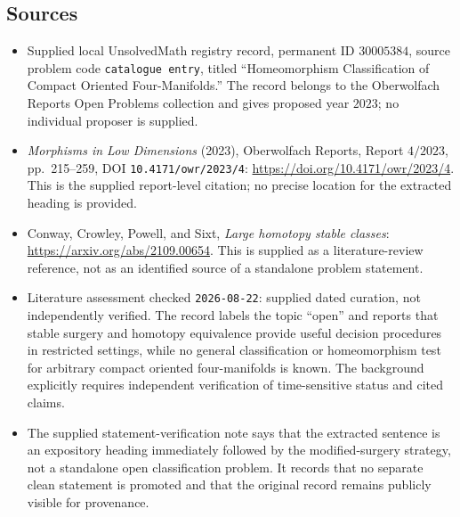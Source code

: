 \documentclass[11pt]{article}
\begin{document}
\subsection{Sources}
\begin{itemize}
\item Supplied local UnsolvedMath registry record, permanent ID \(30005384\), source problem code \texttt{catalogue entry}, titled ``Homeomorphism Classification of Compact Oriented Four-Manifolds.'' The record belongs to the Oberwolfach Reports Open Problems collection and gives proposed year \(2023\); no individual proposer is supplied.
\item \emph{Morphisms in Low Dimensions} (2023), Oberwolfach Reports, Report \(4/2023\), pp.\ 215--259, DOI \texttt{10.4171/owr/2023/4}: \url{https://doi.org/10.4171/owr/2023/4}. This is the supplied report-level citation; no precise location for the extracted heading is provided.
\item Conway, Crowley, Powell, and Sixt, \emph{Large homotopy stable classes}: \url{https://arxiv.org/abs/2109.00654}. This is supplied as a literature-review reference, not as an identified source of a standalone problem statement.
\item Literature assessment checked \texttt{2026-08-22}: supplied dated curation, not independently verified. The record labels the topic ``open'' and reports that stable surgery and homotopy equivalence provide useful decision procedures in restricted settings, while no general classification or homeomorphism test for arbitrary compact oriented four-manifolds is known. The background explicitly requires independent verification of time-sensitive status and cited claims.
\item The supplied statement-verification note says that the extracted sentence is an expository heading immediately followed by the modified-surgery strategy, not a standalone open classification problem. It records that no separate clean statement is promoted and that the original record remains publicly visible for provenance.
\end{itemize}
\end{document}
